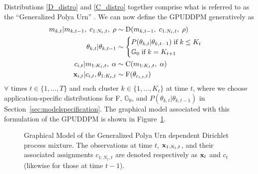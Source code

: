 \documentclass[twocolumn, final]{svjour3}
\begin{document}
Distributions \eqref{D_distro} and \eqref{C_distro} together comprise what is referred to as the ``Generalized Polya Urn'' \cite{caron_2007}. We can now define the GPUDDPM generatively as
\begin{align}
\label{gpuddpm_def}
\begin{split}
m_{k,t} | m_{k,t-1}, \hspace{1mm} c_{1:N_{t}, t}, \hspace{1mm} \rho  &\sim \text{D}(m_{k,t-1}, \hspace{1mm} c_{1:N_{t}, t}, \hspace{1mm} \rho) \\
\theta_{k, t} | \theta_{k, t-1}   & \sim
\begin{cases}
  P(\theta_{k, t} | \theta_{k, t-1}) \hspace{1mm} \text{if} \hspace{1mm} k \leq K_{t} \\ %
  \mathbb{G}_{0} \hspace{1mm} \text{if} \hspace{1mm} k = K_{t+1}
\end{cases} \\
c_{i,t} | m_{1:K_{t},t}, \hspace{1mm} \alpha  &\sim  \text{C} (m_{1:K_{t},t}, \hspace{1mm} \alpha) \\
\bold{x}_{i,t} | c_{i,t}, \theta_{1:K_{t}, t} &\sim \text{F}(\theta_{c_{i,t}, t})
\end{split}
\end{align}
$\forall$ times $t \in \{1, \ldots, T\}$ and each cluster $k \in \{ 1, \ldots, K_{t} \}$ at time $t$, where we choose application-specific distributions for F, $\mathbb{G}_{0}$, and $P(\theta_{k, t} | \theta_{k, t-1})$ in Section~\ref{sec:modelspecification}. The graphical model associated with this formulation of the GPUDDPM is shown in Figure~\ref{fig:gpuddpm_gm_1}.
\begin{figure}[h]
        \caption{\label{fig:gpuddpm_gm_1} Graphical Model of the Generalized Polya Urn dependent Dirichlet process mixture. The observations at time $t$, $\bold{x}_{1:N_{t},t}$, and their associated assignments $c_{1:N_{t},t}$ are denoted respectively as $\bold{x}_{t}$ and $c_{t}$ (likewise for those at time $t-1$).}
\end{figure}
\end{document}
